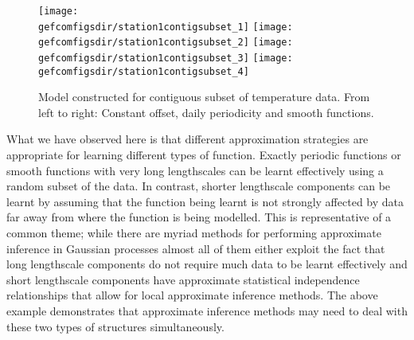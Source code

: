 \begin{figure}[ht]
\centering
\texttt{[image: \\gefcomfigsdir/station1contigsubset\_1]}
\texttt{[image: \\gefcomfigsdir/station1contigsubset\_2]}
\texttt{[image: \\gefcomfigsdir/station1contigsubset\_3]}
\texttt{[image: \\gefcomfigsdir/station1contigsubset\_4]}
\caption[Model constructed for contiguous subset of temperature data.]{
Model constructed for contiguous subset of temperature data. From left to right: Constant offset, daily periodicity and smooth functions.
}
\label{fig:gefcom:contig}
\end{figure}

What we have observed here is that different approximation strategies are appropriate for learning different types of function.
Exactly periodic functions or smooth functions with very long lengthscales can be learnt effectively using a random subset of the data.
In contrast, shorter lengthscale components can be learnt by assuming that the function being learnt is not strongly affected by data far away from where the function is being modelled.
This is representative of a common theme; while there are myriad methods for performing approximate inference in Gaussian processes almost all of them either exploit the fact that long lengthscale components do not require much data to be learnt effectively and short lengthscale components have approximate statistical independence relationships that allow for local approximate inference methods.
The above example demonstrates that approximate inference methods may need to deal with these two types of structures simultaneously.

